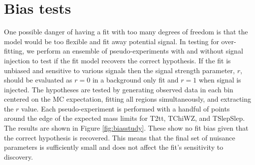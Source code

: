 \section{Bias tests}

One possible danger of having a fit with too many degrees of freedom is that the model would be too flexible and fit away potential signal. In testing for over-fitting, we perform an ensemble of pseudo-experiments with and without signal injection to test if the fit model recovers the correct hypothesis.  If the fit is unbiased and sensitive to various signals then the signal strength parameter, $r$, should be evaluated as $r=0$ in a background only fit and $r=1$ when signal is injected.  The hypotheses are tested by generating observed data in each bin centered on the MC expectation, fitting all regions simultaneously, and extracting the $r$ value. Each pseudo-experiment is performed with a handful of points around the edge of the expected mass limits for T2tt, TChiWZ, and TSlepSlep. The results are shown in Figure \ref{fig:biasstudy}. These show no fit bias given that the correct hypothesis is recovered. This means that the final set of nuisance parameters is sufficiently small and does not affect the fit's sensitivity to discovery.

 


